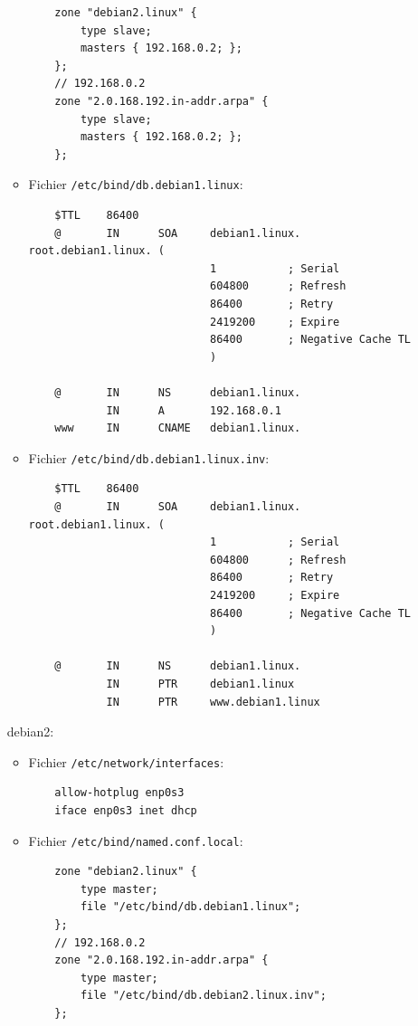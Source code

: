 \documentclass[a4paper]{article}
\begin{document}
\begin{itemize}
\begin{example}
\begin{itemize}
\begin{verbatim}
    zone "debian2.linux" {
        type slave;
        masters { 192.168.0.2; };
    };
    // 192.168.0.2
    zone "2.0.168.192.in-addr.arpa" {
        type slave;
        masters { 192.168.0.2; };
    };
        \end{verbatim}
        \item Fichier \texttt{/etc/bind/db.debian1.linux}:
        \begin{verbatim}
    $TTL    86400
    @       IN      SOA     debian1.linux.    root.debian1.linux. (
                            1           ; Serial
                            604800      ; Refresh
                            86400       ; Retry
                            2419200     ; Expire
                            86400       ; Negative Cache TL
                            )

    @       IN      NS      debian1.linux.
            IN      A       192.168.0.1
    www     IN      CNAME   debian1.linux.
        \end{verbatim}
        \item Fichier \texttt{/etc/bind/db.debian1.linux.inv}:
        \begin{verbatim}
    $TTL    86400
    @       IN      SOA     debian1.linux.    root.debian1.linux. (
                            1           ; Serial
                            604800      ; Refresh
                            86400       ; Retry
                            2419200     ; Expire
                            86400       ; Negative Cache TL
                            )

    @       IN      NS      debian1.linux.
            IN      PTR     debian1.linux
            IN      PTR     www.debian1.linux
        \end{verbatim}
    \end{itemize}
    debian2:
    \begin{itemize}
        \item Fichier \texttt{/etc/network/interfaces}:
        \begin{verbatim}
    allow-hotplug enp0s3
    iface enp0s3 inet dhcp
        \end{verbatim}
        \item Fichier \texttt{/etc/bind/named.conf.local}:
        \begin{verbatim}
    zone "debian2.linux" {
        type master;
        file "/etc/bind/db.debian1.linux";
    };
    // 192.168.0.2
    zone "2.0.168.192.in-addr.arpa" {
        type master;
        file "/etc/bind/db.debian2.linux.inv";
    };


\end{verbatim}
\end{itemize}
\end{example}
\end{itemize}
\end{document}
